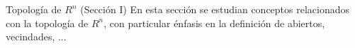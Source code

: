 \begin{chapter}{Topología de $R^n$ (Sección I)}
En esta sección se estudian conceptos relacionados con la topología de $R^n$, con particular énfasis en la definición de abiertos, vecindades, ...
\end{chapter}
